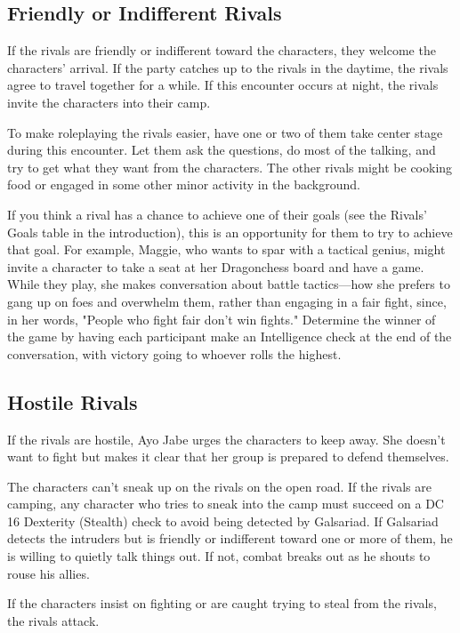 \documentclass[10pt,a4paper,twoside,twocolumn,openany,nodeprecatedcode]{dndbook}
\begin{document}
\subsection{Friendly or Indifferent Rivals}
If the rivals are friendly or indifferent toward the characters, they welcome the characters' arrival. If the party catches up to the rivals in the daytime, the rivals agree to travel together for a while. If this encounter occurs at night, the rivals invite the characters into their camp.

To make roleplaying the rivals easier, have one or two of them take center stage during this encounter. Let them ask the questions, do most of the talking, and try to get what they want from the characters. The other rivals might be cooking food or engaged in some other minor activity in the background.

If you think a rival has a chance to achieve one of their goals (see the Rivals' Goals table in the introduction), this is an opportunity for them to try to achieve that goal. For example, Maggie, who wants to spar with a tactical genius, might invite a character to take a seat at her Dragonchess board and have a game. While they play, she makes conversation about battle tactics—how she prefers to gang up on foes and overwhelm them, rather than engaging in a fair fight, since, in her words, "People who fight fair don't win fights." Determine the winner of the game by having each participant make an Intelligence check at the end of the conversation, with victory going to whoever rolls the highest.

\subsection{Hostile Rivals}
If the rivals are hostile, Ayo Jabe urges the characters to keep away. She doesn't want to fight but makes it clear that her group is prepared to defend themselves.

The characters can't sneak up on the rivals on the open road. If the rivals are camping, any character who tries to sneak into the camp must succeed on a DC 16 Dexterity (Stealth) check to avoid being detected by Galsariad. If Galsariad detects the intruders but is friendly or indifferent toward one or more of them, he is willing to quietly talk things out. If not, combat breaks out as he shouts to rouse his allies.

If the characters insist on fighting or are caught trying to steal from the rivals, the rivals attack.
\end{document}
